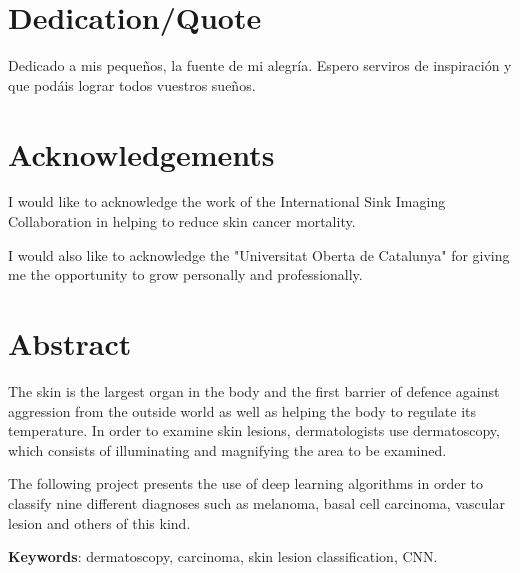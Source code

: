 \chapter*{Dedication/Quote}

Dedicado a mis pequeños, la fuente de mi alegría. Espero serviros de inspiración y que podáis lograr todos vuestros sueños. 

\chapter*{Acknowledgements}

I would like to acknowledge the work of the International Sink Imaging Collaboration \cite{isic_web} in helping to reduce skin cancer mortality. 

I would also like to acknowledge the "Universitat Oberta de Catalunya" for giving me the opportunity to grow personally and professionally.

\chapter*{Abstract}

\onehalfspacing

The skin is the largest organ in the body and the first barrier of defence against aggression from the outside world as well as helping the body to regulate its temperature. In order to examine skin lesions, dermatologists use dermatoscopy, which consists of illuminating and magnifying the area to be examined. 

The following project presents the use of deep learning algorithms in order to classify nine different diagnoses such as melanoma, basal cell carcinoma, vascular lesion and others of this kind.



\vspace{1.5cm}

\textbf{Keywords}: dermatoscopy, carcinoma, skin lesion classification, CNN.
